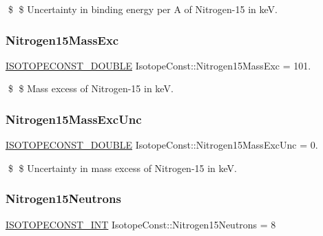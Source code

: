 \$ \$ Uncertainty in binding energy per A of Nitrogen-\/15 in keV. \mbox{\label{group___isotope_const-_nitrogen-_n15_gae0f01c3b6ea6ae0cd44a57b260b7dc53}} 
\subsubsection{\texorpdfstring{Nitrogen15\+Mass\+Exc}{Nitrogen15MassExc}}
{\footnotesize\ttfamily \mbox{\hyperlink{group___isotope_const-_macros_ga8f45a7272ce02c0b4c65c44636ed719a}{I\+S\+O\+T\+O\+P\+E\+C\+O\+N\+S\+T\+\_\+\+D\+O\+U\+B\+LE}} Isotope\+Const\+::\+Nitrogen15\+Mass\+Exc = 101.}

\$ \$ Mass excess of Nitrogen-\/15 in keV. \mbox{\label{group___isotope_const-_nitrogen-_n15_gaf6fe76206d86dd8821ee75ab98cd9c98}} 
\subsubsection{\texorpdfstring{Nitrogen15\+Mass\+Exc\+Unc}{Nitrogen15MassExcUnc}}
{\footnotesize\ttfamily \mbox{\hyperlink{group___isotope_const-_macros_ga8f45a7272ce02c0b4c65c44636ed719a}{I\+S\+O\+T\+O\+P\+E\+C\+O\+N\+S\+T\+\_\+\+D\+O\+U\+B\+LE}} Isotope\+Const\+::\+Nitrogen15\+Mass\+Exc\+Unc = 0.}

\$ \$ Uncertainty in mass excess of Nitrogen-\/15 in keV. \mbox{\label{group___isotope_const-_nitrogen-_n15_ga20bb1f7c35bbf573267574412f4dba25}} 
\subsubsection{\texorpdfstring{Nitrogen15\+Neutrons}{Nitrogen15Neutrons}}
{\footnotesize\ttfamily \mbox{\hyperlink{group___isotope_const-_macros_ga5f18360b3e99483a35c32d789e62621c}{I\+S\+O\+T\+O\+P\+E\+C\+O\+N\+S\+T\+\_\+\+I\+NT}} Isotope\+Const\+::\+Nitrogen15\+Neutrons = 8}

